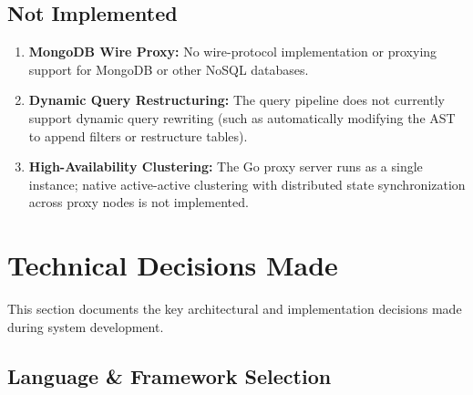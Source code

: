 \subsection{Not Implemented}

\begin{enumerate}
    \item \textbf{MongoDB Wire Proxy:} No wire-protocol implementation or proxying support for MongoDB or other NoSQL databases.
    \item \textbf{Dynamic Query Restructuring:} The query pipeline does not currently support dynamic query rewriting (such as automatically modifying the AST to append filters or restructure tables).
    \item \textbf{High-Availability Clustering:} The Go proxy server runs as a single instance; native active-active clustering with distributed state synchronization across proxy nodes is not implemented.
\end{enumerate}

\section{Technical Decisions Made}

This section documents the key architectural and implementation decisions made during system development.

\subsection{Language \& Framework Selection}

